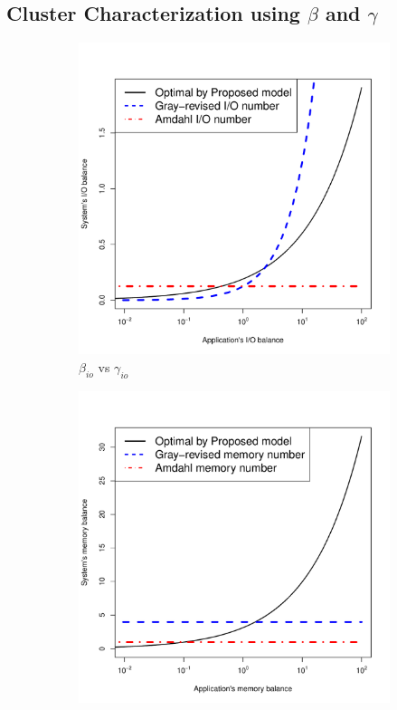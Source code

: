 \documentclass[journal]{IEEEtran}
\begin{document}
\subsection{Cluster Characterization using $\beta$ and $\gamma$}
\begin{figure}[htb]
	\begin{subfigure}[b]{0.48\textwidth}
                \includegraphics[width=\textwidth]{Figures/ModelFigures/beta_io.pdf}
                \caption{$\beta_{io}$ vs  $\gamma_{io}$}
                \label{fig:beta_io}
    \end{subfigure}
 	\begin{subfigure}[b]{0.48\textwidth}
                \includegraphics[width=\textwidth]{Figures/ModelFigures/beta_mem.pdf}

\end{subfigure}
\end{figure}
\end{document}
